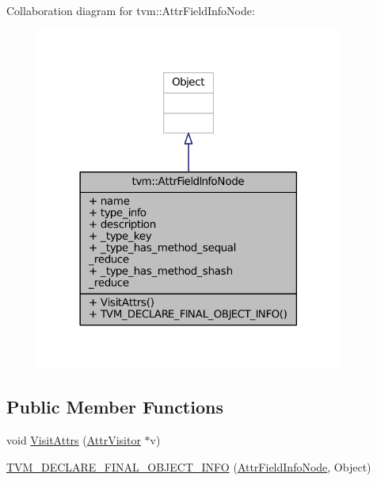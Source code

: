 Collaboration diagram for tvm\+:\+:Attr\+Field\+Info\+Node\+:
\nopagebreak
\begin{figure}[H]
\begin{center}
\leavevmode
\includegraphics[width=285pt]{classtvm_1_1AttrFieldInfoNode__coll__graph}
\end{center}
\end{figure}
\subsection*{Public Member Functions}
\begin{DoxyCompactItemize}
\item 
void \hyperlink{classtvm_1_1AttrFieldInfoNode_aa8428bae334dcf9c3f2f6594a818742c}{Visit\+Attrs} (\hyperlink{classtvm_1_1AttrVisitor}{Attr\+Visitor} $\ast$v)
\item 
\hyperlink{classtvm_1_1AttrFieldInfoNode_a915476a2aefc4dfb342c3aa40f235b81}{T\+V\+M\+\_\+\+D\+E\+C\+L\+A\+R\+E\+\_\+\+F\+I\+N\+A\+L\+\_\+\+O\+B\+J\+E\+C\+T\+\_\+\+I\+N\+FO} (\hyperlink{classtvm_1_1AttrFieldInfoNode}{Attr\+Field\+Info\+Node}, Object)
\end{DoxyCompactItemize}
